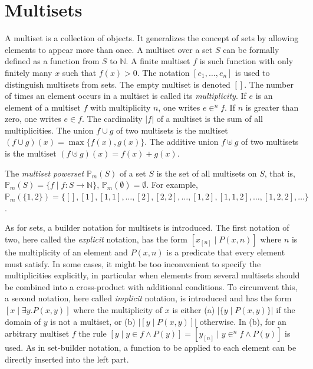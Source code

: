 \documentclass[
    a4paper,
    12pt,
    twoside,
    BCOR=12mm,
    parskip=half,
    chapterprefix,
    numbers=noenddot,
    bibliography=totoc
]{scrbook}
\begin{document}
\section{Multisets}

A multiset \citep{blizard_multiset_1988} is a collection of objects. It generalizes the concept of sets by allowing elements to appear more than once.
A multiset over a set $S$ can be formally defined as a function from $S$ to $\mathbb{N}$. 
A finite multiset $f$ is such function with only finitely many $x$ such that $f(x) > 0$.
The notation $[e_1,\ldots,e_n]$ is used to distinguish multisets from sets. The empty multiset is denoted $[]$. The number of times an element occurs in a multiset is called its \emph{multiplicity}. If $e$ is an element of a multiset $f$ with multiplicity $n$, one writes $e \in^n f$. If $n$ is greater than zero, one writes $e \in f$. The cardinality $|f|$ of a multiset is the sum of all multiplicities. The union $f \cup g$ of two multisets is the multiset $(f \cup g)(x)=\max \{f(x),g(x)\}$. The additive union $f \uplus g$ of two multisets is the multiset $(f \uplus g)(x)=f(x)+g(x)$.

The \emph{multiset powerset} $\mathbb{P}_m(S)$ of a set $S$ is the set of all multisets on $S$, that is, $\mathbb{P}_m(S) = \{ f \mid f : S \to \mathbb{N} \}$, $\mathbb{P}_m(\emptyset)=\emptyset$. 
For example, $\mathbb{P}_m(\{1,2\})=\{ [],[1],[1,1],\ldots,[2],\allowbreak[2,2],\ldots,[1,2],[1,1,2],\ldots,[1,2,2],\ldots\}$. \citep[Def. 75]{kotowski_constructive_2011}

As for sets, a builder notation for multisets is introduced. The first notation of two, here called the \emph{explicit} notation, has the form $[x_{[n]} \mid P(x,n)]$ where $n$ is the multiplicity of an element and $P(x,n)$ is a predicate that every element must satisfy. In some cases, it might be too inconvenient to specify the multiplicities explicitly, in particular when elements from several multisets should be combined into a cross-product with additional conditions. To circumvent this, a second notation, here called \emph{implicit} notation, is introduced and has the form $[x \mid \exists y.P(x,y)]$ where the multiplicity of $x$ is either (a) $|\{y \mid P(x,y)\}|$ if the domain of $y$ is not a multiset, or (b) $|[y \mid P(x,y)]|$ otherwise. In (b), for an arbitrary multiset $f$ the rule $[y \mid y \in f \wedge P(y)]=[y_{[n]} \mid y \in^n f \wedge P(y)]$ is used. As in set-builder notation, a function to be applied to each element can be directly inserted into the left part.
\end{document}
